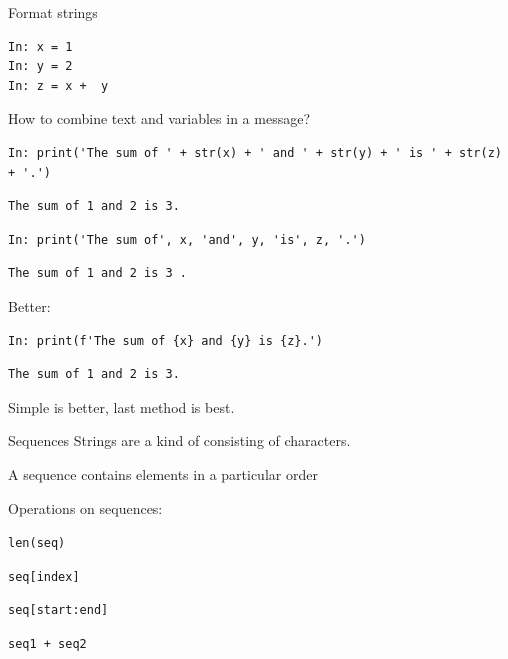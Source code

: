 \documentclass[aspectratio=169,usenames,dvipsnames]{beamer}
\begin{document}
\begin{frame}[fragile]{Format strings}
\begin{lstlisting}
In: x = 1
In: y = 2
In: z = x +  y
\end{lstlisting}
How to combine text and variables in a message?
\begin{lstlisting}
In: print('The sum of ' + str(x) + ' and ' + str(y) + ' is ' + str(z) + '.')
\end{lstlisting}\vspace{-1em}
\begin{lstlisting}[style=plain]
The sum of 1 and 2 is 3.
\end{lstlisting}\vspace{-1em}
\begin{lstlisting}
In: print('The sum of', x, 'and', y, 'is', z, '.')
\end{lstlisting}\vspace{-1em}
\begin{lstlisting}[style=plain]
The sum of 1 and 2 is 3 .
\end{lstlisting}

\pause
Better:
\begin{lstlisting}
In: print(f'The sum of {x} and {y} is {z}.')
\end{lstlisting}\vspace{-1em}
\begin{lstlisting}[style=plain]
The sum of 1 and 2 is 3.
\end{lstlisting}

Simple is better, last method is best.
\end{frame}

\begin{frame}{Sequences}
    Strings are a kind of 
    consisting of characters.

    \vspace{1em}
    A sequence contains elements in a particular order

    \vspace{1em}
    Operations on sequences:
    \begin{description}[concatenation:]
        \item[getting length:]     \lstinline{len(seq)}
        \item[indexing:]           \lstinline{seq[index]}
        \item[slicing:]            \lstinline{seq[start:end]}
        \item[concatenation:]      \lstinline{seq1 + seq2}
    \end{description}
\end{frame}
\end{document}
